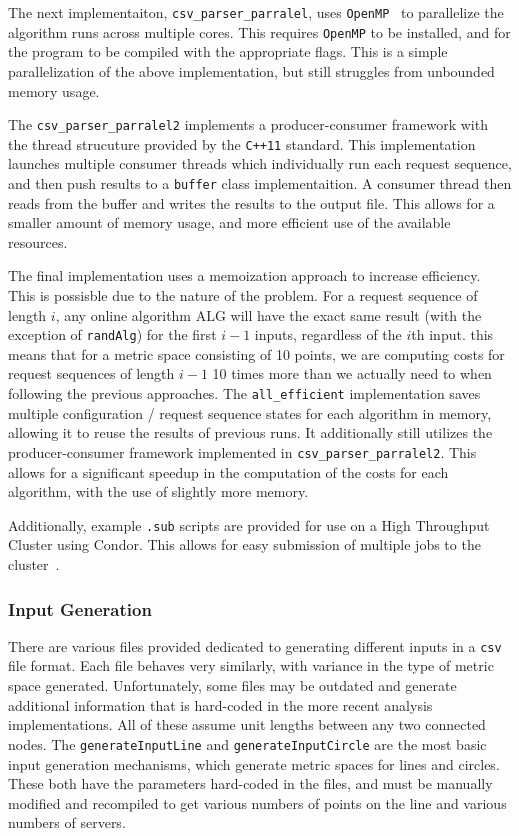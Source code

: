 The next implementaiton, \texttt{csv\_parser\_parralel}, uses \texttt{OpenMP}~\cite{openmp08} to parallelize the algorithm runs across multiple cores. This requires \texttt{OpenMP} to be installed, and for the program to be compiled with the appropriate flags. This is a simple parallelization of the above implementation, but still struggles from unbounded memory usage.

The \texttt{csv\_parser\_parralel2} implements a producer-consumer framework with the thread strucuture provided by the \texttt{C++11} standard. This implementation launches multiple consumer threads which individually run each request sequence, and then push results to a \texttt{buffer} class implementaition. A consumer thread then reads from the buffer and writes the results to the output file. This allows for a smaller amount of memory usage, and more efficient use of the available resources.


The final implementation uses a memoization approach to increase efficiency. This is possisble due to the nature of the \KS problem. For a request sequence of length $i$, any online algorithm $\mathrm{ALG}$ will have the exact same result (with the exception of \texttt{randAlg}) for the first $i-1$ inputs, regardless of the $i$th input. this means that for a metric space consisting of 10 points, we are computing costs for request sequences of length $i-1$ 10 times more than we actually need to when following the previous approaches. The \texttt{all\_efficient} implementation saves multiple configuration / request sequence states for each algorithm in memory, allowing it to reuse the results of previous runs. It additionally still utilizes the producer-consumer framework implemented in \texttt{csv\_parser\_parralel2}. This allows for a significant speedup in the computation of the costs for each algorithm, with the use of slightly more memory.

Additionally, example \texttt{.sub} scripts are provided for use on a High Throughput Cluster using Condor. This allows for easy submission of multiple jobs to the cluster~\cite{htcondor}. 

\subsubsection*{Input Generation}

There are various files provided dedicated to generating different inputs in a \texttt{csv} file format. Each file behaves very similarly, with variance in the type of metric space generated. Unfortunately, some files may be outdated and generate additional information that is hard-coded in the more recent analysis implementations. All of these assume unit lengths between any two connected nodes. The \texttt{generateInputLine} and \texttt{generateInputCircle} are the most basic input generation mechanisms, which generate metric spaces for lines and circles. These both have the parameters hard-coded in the files, and must be manually modified and recompiled to get various numbers of points on the line and various numbers of servers.

